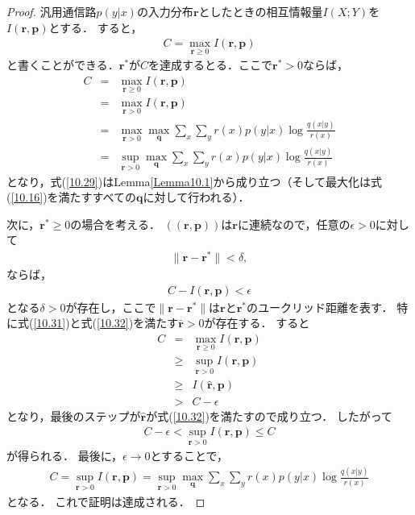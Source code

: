 \documentclass{ltjsarticle}
\theoremstyle{definition}
\begin{document}
\begin{proof}
  汎用通信路$p(y|x)$の入力分布$\mathbf{r}$としたときの相互情報量$I(X;Y)$を$I(\mathbf{r}, \mathbf{p})$とする．
  すると，
  \begin{eqnarray}
    \label{10.26}
    C = \max_{\mathbf{r} \geq 0} I (\mathbf{r}, \mathbf{p})
  \end{eqnarray}
  と書くことができる．$\mathbf{r}^*$が$C$を達成するとる．ここで$\mathbf{r}^* > 0$ならば，
  \begin{eqnarray}
    \label{10.27}
    C &=& \max_{\mathbf{r} \geq 0} I(\mathbf{r}, \mathbf{p}) \\
    \label{10.28}
    &=& \max_{\mathbf{r} > 0} I(\mathbf{r}, \mathbf{p}) \\
    \label{10.29}
    &=& \max_{\mathbf{r} > 0} \max_{\mathbf{q}} \sum_{x} \sum_{y} r(x) p(y|x) \log \frac{q(x|y)}{r(x)} \\
    \label{10.30}
    &=& \sup_{\mathbf{r} > 0} \max_{\mathbf{q}} \sum_{x} \sum_{y} r(x) p(y|x) \log \frac{q(x|y)}{r(x)}
  \end{eqnarray}
  となり，式(\ref{10.29})はLemma\ref{Lemma10.1}から成り立つ（そして最大化は式(\ref{10.16})を満たすすべての$\mathbf{q}$に対して行われる）．

  次に，$\mathbf{r}^* \geq 0$の場合を考える．
  $((\mathbf{r}, \mathbf{p}))$は$\mathbf{r}$に連続なので，任意の$\epsilon > 0$に対して
  \begin{eqnarray}
    \label{10.31}
    \parallel \mathbf{r} - \mathbf{r}^* \parallel < \delta,
  \end{eqnarray}
  ならば，
  \begin{eqnarray}
    \label{10.32}
    C - I(\mathbf{r}, \mathbf{p}) < \epsilon
  \end{eqnarray}
  となる$\delta > 0$が存在し，ここで$\parallel \mathbf{r} - \mathbf{r}^* \parallel$は$\mathbf{r}$と$\mathbf{r}^*$のユークリッド距離を表す．
  特に式(\ref{10.31})と式(\ref{10.32})を満たす$\hat{\mathbf{r}} > 0$が存在する．
  すると
  \begin{eqnarray}
    \label{10.33}
    C &=& \max_{\mathbf{r} \geq 0} I(\mathbf{r}, \mathbf{p}) \\
    \label{10.34}
    &\geq& \sup_{\mathbf{r} > 0} I(\mathbf{r}, \mathbf{p}) \\
    \label{10.35}
    &\geq& I(\hat{\mathbf{r}}, \mathbf{p}) \\
    \label{10.36}
    &>& C - \epsilon
  \end{eqnarray}
  となり，最後のステップが$\hat{\mathbf{r}}$が式(\ref{10.32})を満たすので成り立つ．
  したがって
  \begin{eqnarray}
    \label{10.37}
    C - \epsilon < \sup_{\mathbf{r} > 0} I(\mathbf{r}, \mathbf{p}) \leq C
  \end{eqnarray}
  が得られる．
  最後に，$\epsilon \rightarrow 0$とすることで，
  \begin{eqnarray}
    \label{10.38}
    C = \sup_{\mathbf{r} > 0} I(\mathbf{r}, \mathbf{p}) = \sup_{\mathbf{r} > 0} \max_{\mathbf{q}} \sum_{x} \sum_{y} r(x) p(y|x) \log \frac{q(x|y)}{r(x)}
  \end{eqnarray}
  となる．
  これで証明は達成される．
\end{proof}
\end{document}
